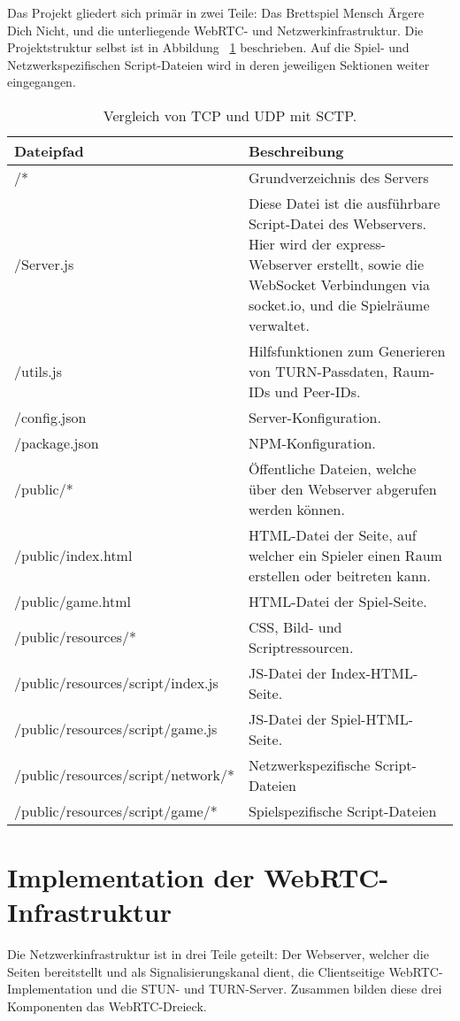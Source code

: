 Das Projekt gliedert sich primär in zwei Teile: Das Brettspiel \glqq{}Mensch Ärgere Dich Nicht\grqq{}, und die unterliegende \acs{WebRTC}- und Netzwerkinfrastruktur. Die Projektstruktur selbst ist in Abbildung~ \ref{table:projectfiles} beschrieben. Auf die Spiel- und Netzwerkspezifischen Script-Dateien wird in deren jeweiligen Sektionen weiter eingegangen.

\begin{table}[ht]
\centering
\begin{tabularx}{\textwidth}{lX}
\toprule
Dateipfad&Beschreibung\\
\midrule
/*&Grundverzeichnis des Servers\\
/Server.js&Diese Datei ist die ausführbare Script-Datei des Webservers. Hier wird der express-Webserver erstellt, sowie die WebSocket Verbindungen via socket.io, und die Spielräume verwaltet.\\
/utils.js&Hilfsfunktionen zum Generieren von TURN-Passdaten, Raum-IDs und Peer-IDs.\\
/config.json&Server-Konfiguration.\\
/package.json&NPM-Konfiguration.\\
\midrule
/public/*&Öffentliche Dateien, welche über den Webserver abgerufen werden können.\\
/public/index.html&HTML-Datei der Seite, auf welcher ein Spieler einen Raum erstellen oder beitreten kann.\\
/public/game.html&HTML-Datei der Spiel-Seite.\\
\midrule
/public/resources/*&CSS, Bild- und Scriptressourcen.\\
/public/resources/script/index.js&JS-Datei der Index-HTML-Seite.\\
/public/resources/script/game.js&JS-Datei der Spiel-HTML-Seite.\\
\midrule
/public/resources/script/network/*&Netzwerkspezifische Script-Dateien\\
/public/resources/script/game/*&Spielspezifische Script-Dateien\\
\bottomrule
\end{tabularx}
\caption{Vergleich von \acs{TCP} und \acs{UDP} mit \acs{SCTP}.}
\label{table:projectfiles}
\end{table}

\section{Implementation der WebRTC-Infrastruktur}
Die Netzwerkinfrastruktur ist in drei Teile geteilt: Der Webserver, welcher die Seiten bereitstellt und als Signalisierungskanal dient, die Clientseitige WebRTC-Implementation und die \acs{STUN}- und \acs{TURN}-Server. Zusammen bilden diese drei Komponenten das \glqq{}WebRTC-Dreieck\grqq{}.

